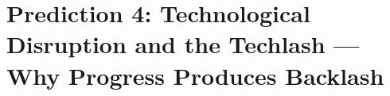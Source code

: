\section{Prediction 4: Technological Disruption and the Techlash --- Why Progress Produces Backlash}
\label{app:prediction-techlash}


\begin{abstract}
This appendix provides the complete technical foundation for Prediction 4 of the 
Complementarity-Context Framework: that rapid technological change triggers 
``techlash''---public backlash against technology---not despite its benefits but 
\emph{because} of asymmetric effects across welfare dimensions. We develop the 
formal model linking technology shocks to context ($\Psi$) and welfare (FEPSDE), 
demonstrate how populations with different welfare weights experience net gains 
or losses, validate against survey data on technology attitudes, and derive 
demographic predictions for techlash concentration. The analysis explains why 
the most technologically advanced societies exhibit the strongest technology skepticism.
\end{abstract}



